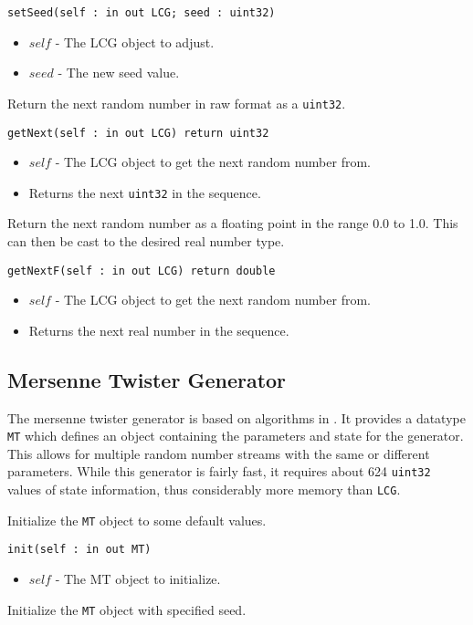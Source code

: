 \documentclass[10pt, openany]{book}
\newcommand{\function}[1]{\texttt{#1}}
\newcommand{\datatype}[1]{\texttt{#1}}
\begin{document}
\function{setSeed(self : in out LCG; seed : uint32)}
\begin{itemize}
  \item $self$ - The LCG object to adjust.
  \item $seed$ - The new seed value.
\end{itemize}

Return the next random number in raw format as a \datatype{uint32}.

\function{getNext(self : in out LCG) return uint32}
\begin{itemize}
  \item $self$ - The LCG object to get the next random number from.
  \item Returns the next \datatype{uint32} in the sequence.
\end{itemize}

Return the next random number as a floating point in the range 0.0 to 1.0.  This can then be cast to the desired real number type.

\function{getNextF(self : in out LCG) return double}
\begin{itemize}
  \item $self$ - The LCG object to get the next random number from.
  \item Returns the next real number in the sequence.
\end{itemize}

\subsection{Mersenne Twister Generator}
The mersenne twister generator is based on algorithms in \cite{MT19937}.  It provides a datatype \datatype{MT} which defines an object containing the parameters and state for the generator.  This allows for multiple random number streams with the same or different parameters.  While this generator is fairly fast, it requires about 624 \datatype{uint32} values of state information, thus considerably more memory than \datatype{LCG}.

Initialize the \datatype{MT} object to some default values.

\function{init(self : in out MT)}
\begin{itemize}
  \item $self$ - The MT object to initialize.
\end{itemize}

Initialize the \datatype{MT} object with specified seed.
\end{document}
